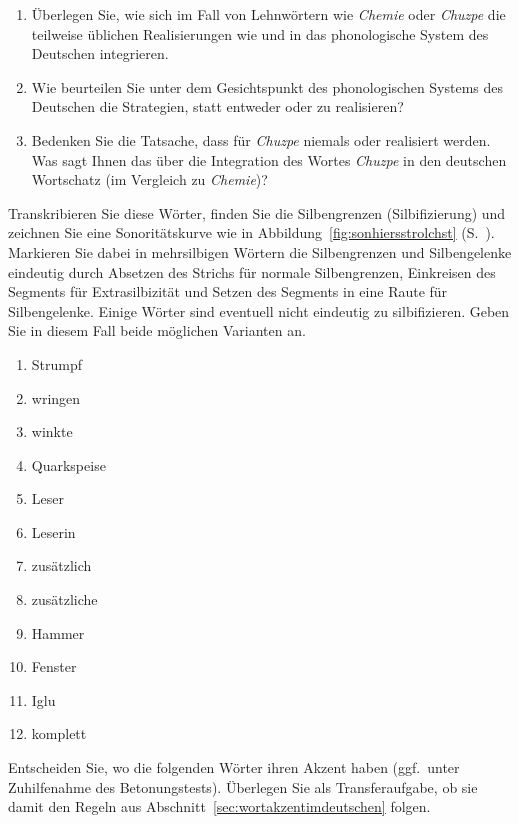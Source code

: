 \begin{enumerate}\Lf
  \item Überlegen Sie, wie sich im Fall von Lehnwörtern wie \textit{Chemie} oder \textit{Chuzpe} die teilweise üblichen Realisierungen wie \textipa{[\c{c}emi:]} und \textipa{[XU\t{ts}p@]} in das phonologische System des Deutschen integrieren.
  \item Wie beurteilen Sie unter dem Gesichtspunkt des phonologischen Systems des Deutschen die Strategien, statt \textipa{[\c{c}emi:]} entweder \textipa{[Semi:]} oder \textipa{[kemi:]} zu realisieren?
  \item Bedenken Sie die Tatsache, dass für \textit{Chuzpe} niemals \textipa{[SU\t{ts}p@]} oder \textipa{[kU\t{ts}p@]} realisiert werden.
    Was sagt Ihnen das über die Integration des Wortes \textit{Chuzpe} in den deutschen Wortschatz (im Vergleich zu \textit{Chemie})?
\end{enumerate}

\Uebung \label{u44} Transkribieren Sie diese Wörter, finden Sie die Silbengrenzen (Silbifizierung) und zeichnen Sie eine Sonoritätskurve wie in Abbildung~\ref{fig:sonhiersstrolchst} (S.~\pageref{fig:sonhiersstrolchst}).
Markieren Sie dabei in mehrsilbigen Wörtern die Silbengrenzen und Silbengelenke eindeutig durch Absetzen des Strichs für normale Silbengrenzen, Einkreisen des Segments für Extrasilbizität und Setzen des Segments in eine Raute für Silbengelenke.
Einige Wörter sind eventuell nicht eindeutig zu silbifizieren.
Geben Sie in diesem Fall beide möglichen Varianten an.

\begin{enumerate}\Lf
  \item Strumpf
  \item wringen
  \item winkte
  \item Quarkspeise
  \item Leser
  \item Leserin
  \item zusätzlich
  \item zusätzliche
  \item Hammer
  \item Fenster
  \item Iglu
  \item komplett
\end{enumerate}

\Uebung \label{u45} Entscheiden Sie, wo die folgenden Wörter ihren Akzent haben (ggf.\ unter Zuhilfenahme des Betonungstests).
Überlegen Sie als Transferaufgabe, ob sie damit den Regeln aus Abschnitt~\ref{sec:wortakzentimdeutschen} folgen.

